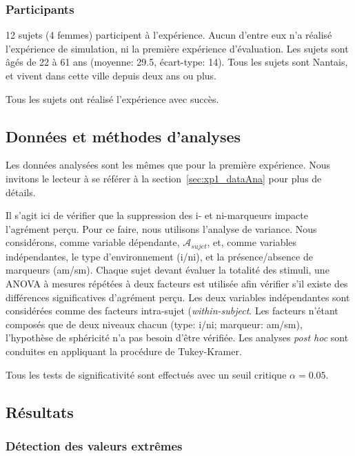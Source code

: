 \documentclass[twoside,twocolumn]{article}
\begin{document}
\subsubsection*{Participants}

12 sujets (4 femmes) participent à l'expérience. Aucun d'entre eux n'a réalisé l'expérience de simulation, ni la première expérience d'évaluation. Les sujets sont âgés de 22 à 61 ans (moyenne: 29.5, écart-type: 14). Tous les sujets sont Nantais, et vivent dans cette ville depuis deux ans ou plus.

Tous les sujets ont réalisé l'expérience avec succès.

\subsection{Données et méthodes d'analyses}

Les données analysées sont les mêmes que pour la première expérience. Nous invitons le lecteur à se référer à la section~\ref{sec:xp1_dataAna} pour plus de détails.

Il s'agit ici de vérifier que la suppression des i- et ni-marqueurs impacte l'agrément perçu. Pour ce faire, nous utilisons l'analyse de variance. Nous considérons, comme variable dépendante, $\mathcal{A}_{sujet}$, et, comme variables indépendantes, le type d'environnement (i/ni), et la présence/absence de marqueurs (am/sm). Chaque sujet devant évaluer la totalité des stimuli, une ANOVA à mesures répétées à deux facteurs est utilisée afin vérifier s'il existe des différences significatives d'agrément perçu. Les deux variables indépendantes sont considérées comme des facteurs intra-sujet (\emph{within-subject}. Les facteurs n'étant composés que de deux niveaux chacun (type: i/ni; marqueur: am/sm), l'hypothèse de sphéricité n'a pas besoin d'être vérifiée. Les analyses \emph{post hoc} sont conduites en appliquant la procédure de Tukey-Kramer.

Tous les tests de significativité sont effectués avec un seuil critique $\alpha=0.05$.

\subsection{Résultats}

\subsubsection{Détection des valeurs extrêmes}
\end{document}
